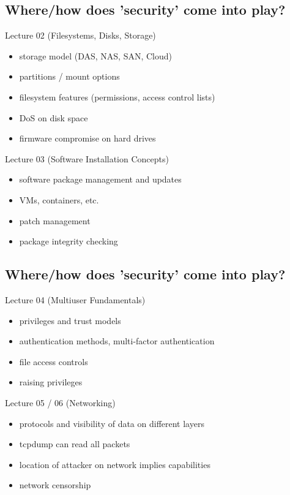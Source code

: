 \documentclass[xga]{xdvislides}
\begin{document}
\subsection{Where/how does 'security' come into play?}
Lecture 02 (Filesystems, Disks, Storage)
\begin{itemize}
	\item storage model (DAS, NAS, SAN, Cloud)
	\item partitions / mount options
	\item filesystem features (permissions, access control lists)
	\item DoS on disk space
	\item firmware compromise on hard drives
\end{itemize}
\vspace{.5in}
Lecture 03 (Software Installation Concepts)
\begin{itemize}
	\item software package management and updates
	\item VMs, containers, etc.
	\item patch management
	\item package integrity checking
\end{itemize}

\subsection{Where/how does 'security' come into play?}
Lecture 04 (Multiuser Fundamentals)
\begin{itemize}
	\item privileges and trust models
	\item authentication methods, multi-factor authentication
	\item file access controls
	\item raising privileges
\end{itemize}
\vspace{.5in}
Lecture 05 / 06 (Networking)
\begin{itemize}
	\item protocols and visibility of data on different layers
	\item tcpdump can read all packets
	\item location of attacker on network implies capabilities
	\item network censorship
\end{itemize}
\end{document}
